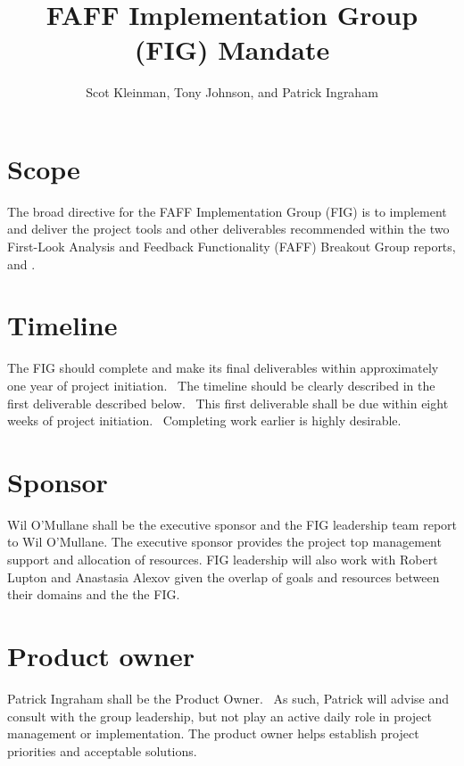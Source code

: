 \documentclass[SE,authoryear,lsstdraft]{lsstdoc}
\title{FAFF Implementation Group (FIG) Mandate}
\author{%
Scot Kleinman,
Tony Johnson,
and
Patrick Ingraham
}
\date{\vcsDate}
\begin{document}
\maketitle

\section{Scope}
The broad directive for the FAFF Implementation Group (FIG) is to
implement and deliver the project tools and other deliverables recommended
within the two First-Look Analysis and Feedback Functionality (FAFF)
Breakout Group reports,  and .

\section{Timeline}
The FIG should complete and make its final deliverables within
approximately one year of project initiation.  The timeline should be
clearly described in the first deliverable described below.  This first
deliverable shall be due within eight weeks of project initiation. 
Completing work earlier is highly desirable.


\section{Sponsor}
Wil O’Mullane shall be the executive sponsor and the FIG leadership
team report to Wil O’Mullane.  The executive sponsor provides the
project top management support and allocation of resources.
FIG leadership will also work with Robert Lupton and
Anastasia Alexov given the overlap of goals and
resources between their domains and the the FIG.



\section{Product owner}
Patrick Ingraham shall be the Product Owner.  As such, Patrick will
advise and consult with the group leadership, but not play an active
daily role in project management or implementation.  The product owner
helps establish project priorities and acceptable solutions.
\end{document}
